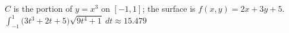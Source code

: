 {$C$ is the portion of $y=x^3$ on $[-1,1]$; the surface is $f(x,y)=2x+3y+5$.
}
{$\int_{-1}^{1} \big(3t^3+2t+5\big)\sqrt{9t^4+1}\ dt \approx 15.479$
}
